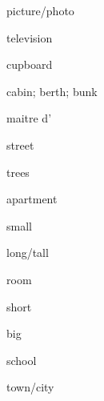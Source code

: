 \begin{flashcard}{\LARGE picture/photo}
\LARGE {}
\end{flashcard}
\begin{flashcard}{\LARGE television}
\LARGE {}
\end{flashcard}
\begin{flashcard}{\LARGE cupboard}
\LARGE {}
\end{flashcard}
\begin{flashcard}{\LARGE cabin; berth; bunk}
\LARGE {}
\end{flashcard}
\begin{flashcard}{\LARGE maitre d'}
\LARGE {}
\end{flashcard}
\begin{flashcard}{\LARGE street}
\LARGE {}
\end{flashcard}
\begin{flashcard}{\LARGE trees}
\LARGE {}
\end{flashcard}
\begin{flashcard}{\LARGE apartment}
\LARGE {}
\end{flashcard}
\begin{flashcard}{\LARGE small}
\LARGE {}
\end{flashcard}
\begin{flashcard}{\LARGE long/tall}
\LARGE {}
\end{flashcard}
\begin{flashcard}{\LARGE room}
\LARGE {}
\end{flashcard}
\begin{flashcard}{\LARGE short}
\LARGE {}
\end{flashcard}
\begin{flashcard}{\LARGE big}
\LARGE {}
\end{flashcard}
\begin{flashcard}{\LARGE school}
\LARGE {}
\end{flashcard}
\begin{flashcard}{\LARGE town/city}
\LARGE {}
\end{flashcard}
